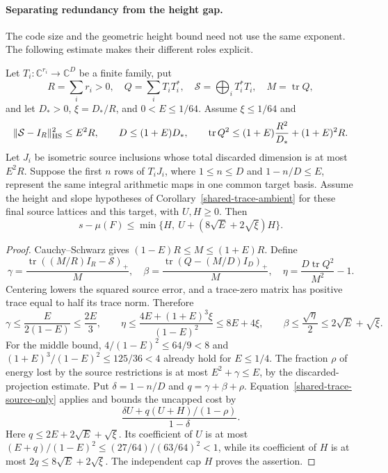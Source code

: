 \paragraph{Separating redundancy from the height gap.}
The code size and the geometric height bound need not use the same
exponent. The following estimate makes their different roles explicit.

\begin{proposition}\label{shared-code-trace}
Let \(T_i:\mathbb C^{r_i}\to\mathbb C^D\) be a finite family, put
\[
 R=\sum_i r_i>0,\quad Q=\sum_iT_iT_i^*,\quad
 \mathcal S=\bigoplus_iT_i^*T_i,\quad M=\operatorname{tr}Q,
\]
and let \(D_*>0\), \(\xi=D_*/R\), and \(0<E\le1/64\).
Assume \(\xi\le1/64\) and
\[
 \|\mathcal S-I_R\|_{\rm HS}^2\le E^2R,\qquad
 D\le(1+E)D_*,\qquad
 \operatorname{tr}Q^2\le(1+E)\frac{R^2}{D_*}+(1+E)^2R.
\]
Let \(J_i\) be isometric source inclusions whose total discarded
dimension is at most \(E^2R\). Suppose the first \(n\) rows of
\(T_iJ_i\), where \(1\le n\le D\) and \(1-n/D\le E\), represent
the same integral arithmetic maps in one common target basis.
Assume the height and slope hypotheses of
Corollary~\ref{shared-trace-ambient} for these final source lattices
and this target, with \(U,H\ge0\). Then
\begin{equation}\label{shared-code-trace-bound}
 s-\mu(F)\le\min\{H,\ U+(8\sqrt E+2\sqrt\xi)H\}.
\end{equation}
\end{proposition}

\begin{proof}
Cauchy--Schwarz gives \((1-E)R\le M\le(1+E)R\).
Define
\[
 \gamma=\frac{\operatorname{tr}((M/R)I_R-\mathcal S)_+}{M},\quad
 \beta=\frac{\operatorname{tr}(Q-(M/D)I_D)_+}{M},\quad
 \eta=\frac{D\operatorname{tr}Q^2}{M^2}-1 .
\]
Centering lowers the squared source error, and a trace-zero matrix
has positive trace equal to half its trace norm. Therefore
\[
 \gamma\le\frac{E}{2(1-E)}\le\frac{2E}{3},\qquad
 \eta\le\frac{4E+(1+E)^3\xi}{(1-E)^2}\le8E+4\xi,\qquad
 \beta\le\frac{\sqrt\eta}{2}\le2\sqrt E+\sqrt\xi .
\]
For the middle bound, \(4/(1-E)^2\le64/9<8\) and
\((1+E)^3/(1-E)^2\le125/36<4\) already hold for \(E\le1/4\).
The fraction \(\rho\) of energy lost by the source restrictions is
at most \(E^2+\gamma\le E\), by the discarded-projection estimate.
Put \(\delta=1-n/D\) and \(q=\gamma+\beta+\rho\).
Equation~\eqref{shared-trace-source-only} applies and bounds the
uncapped cost by
\[
 \frac{\delta U+q(U+H)/(1-\rho)}{1-\delta}.
\]
Here \(q\le2E+2\sqrt E+\sqrt\xi\). Its coefficient of \(U\) is at most
\((E+q)/(1-E)^2\le(27/64)/(63/64)^2<1\), while its coefficient of
\(H\) is at most \(2q\le8\sqrt E+2\sqrt\xi\).
The independent cap \(H\) proves the assertion.
\end{proof}

